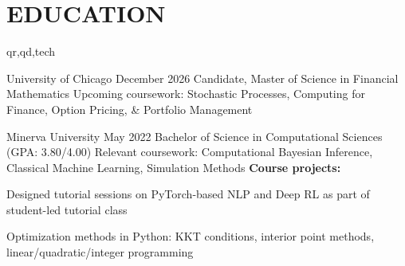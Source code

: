 \section{EDUCATION}
\begin{rolecontent}{qr,qd,tech}
\begin{education_xp}[Chicago, IL]
                   {University of Chicago}
                   {December 2026}
                   {Candidate, Master of Science in Financial Mathematics}
    Upcoming coursework: Stochastic Processes, Computing for Finance, Option Pricing, \& Portfolio Management
    \begin{highlights}
    \end{highlights}
\end{education_xp}
\end{rolecontent}
\vspace{0.1 cm}
\begin{education_xp}
                   {Minerva University}
                   {May 2022}
                   {Bachelor of Science in Computational Sciences (GPA: 3.80/4.00)}
    Relevant coursework: Computational Bayesian Inference, Classical Machine Learning, Simulation Methods\newline
    \textbf{Course projects:}
    \begin{highlights}
        \item Designed tutorial sessions on PyTorch-based NLP and Deep RL as part of student-led tutorial class
        \item Optimization methods in Python: KKT conditions, interior point methods, linear/quadratic/integer programming
    \end{highlights}
\end{education_xp}
